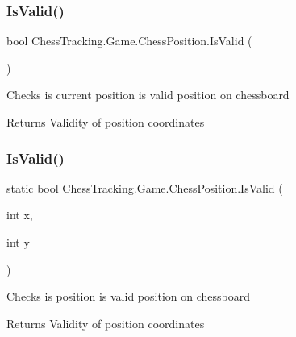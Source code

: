 \subsubsection{\texorpdfstring{IsValid()}{IsValid()}\hspace{0.1cm}{\footnotesize\ttfamily [1/2]}}
{\footnotesize\ttfamily bool Chess\+Tracking.\+Game.\+Chess\+Position.\+Is\+Valid (\begin{DoxyParamCaption}{ }\end{DoxyParamCaption})}



Checks is current position is valid position on chessboard 

\begin{DoxyReturn}{Returns}
Validity of position coordinates
\end{DoxyReturn}
\mbox{\label{class_chess_tracking_1_1_game_1_1_chess_position_ad32aafa65d366856bc27b37565e0aff8}} 
\subsubsection{\texorpdfstring{IsValid()}{IsValid()}\hspace{0.1cm}{\footnotesize\ttfamily [2/2]}}
{\footnotesize\ttfamily static bool Chess\+Tracking.\+Game.\+Chess\+Position.\+Is\+Valid (\begin{DoxyParamCaption}\item[{int}]{x,  }\item[{int}]{y }\end{DoxyParamCaption})\hspace{0.3cm}{\ttfamily [static]}}



Checks is position is valid position on chessboard 

\begin{DoxyReturn}{Returns}
Validity of position coordinates
\end{DoxyReturn}
\mbox{\label{class_chess_tracking_1_1_game_1_1_chess_position_aa65a17af184774b44f0631a8014e17d0}} 
